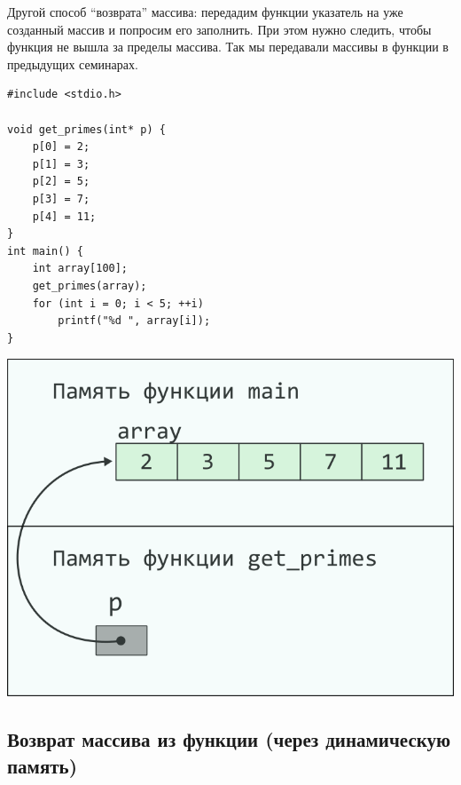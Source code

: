 \documentclass{article}
\begin{document}
Другой способ ``возврата'' массива: передадим функции указатель на
уже созданный массив и попросим его заполнить.
При этом нужно следить, чтобы функция не вышла за пределы массива.
Так мы передавали массивы в функции в предыдущих семинарах.
\begin{multicols}{2}
\begin{lstlisting}
#include <stdio.h>

void get_primes(int* p) {
	p[0] = 2;
	p[1] = 3;
	p[2] = 5;
	p[3] = 7;
	p[4] = 11;	
}
int main() {
	int array[100];
	get_primes(array);
	for (int i = 0; i < 5; ++i)
		printf("%d ", array[i]);
}
\end{lstlisting}
\columnbreak
\begin{center}
\includegraphics[scale=1]{../images/pointer_schemes/function_return_arg_array.png}
\end{center}
\end{multicols}
\newpage
\subsection*{Возврат массива из функции (через динамическую память)}
\end{document}
